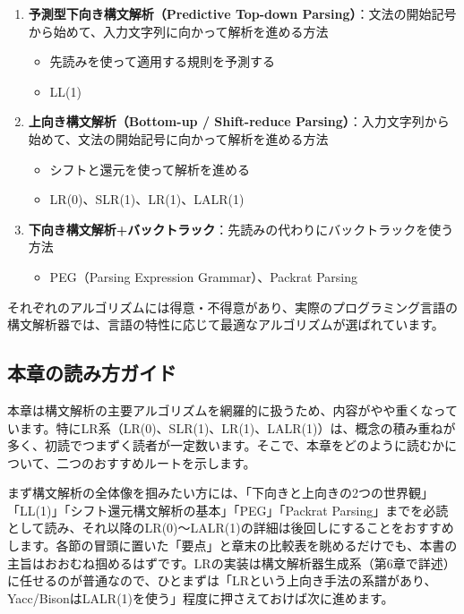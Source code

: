 \begin{enumerate}
\def\labelenumi{\arabic{enumi}.}
\tightlist
\item
  \textbf{予測型下向き構文解析（Predictive Top-down
  Parsing）}：文法の開始記号から始めて、入力文字列に向かって解析を進める方法

  \begin{itemize}
  \tightlist
  \item
    先読みを使って適用する規則を予測する
  \item
    LL(1)
  \end{itemize}
\item
  \textbf{上向き構文解析（Bottom-up / Shift-reduce
  Parsing）}：入力文字列から始めて、文法の開始記号に向かって解析を進める方法

  \begin{itemize}
  \tightlist
  \item
    シフトと還元を使って解析を進める
  \item
    LR(0)、SLR(1)、LR(1)、LALR(1)
  \end{itemize}
\item
  \textbf{下向き構文解析+バックトラック}：先読みの代わりにバックトラックを使う方法

  \begin{itemize}
  \tightlist
  \item
    PEG（Parsing Expression Grammar）、Packrat Parsing
  \end{itemize}
\end{enumerate}

それぞれのアルゴリズムには得意・不得意があり、実際のプログラミング言語の構文解析器では、言語の特性に応じて最適なアルゴリズムが選ばれています。

\hypertarget{chapter5-ux672cux7ae0ux306eux8aadux307fux65b9ux30acux30a4ux30c9}{%
\subsection{本章の読み方ガイド}\label{chapter5-ux672cux7ae0ux306eux8aadux307fux65b9ux30acux30a4ux30c9}}

本章は構文解析の主要アルゴリズムを網羅的に扱うため、内容がやや重くなっています。特にLR系（LR(0)、SLR(1)、LR(1)、LALR(1)）は、概念の積み重ねが多く、初読でつまずく読者が一定数います。そこで、本章をどのように読むかについて、二つのおすすめルートを示します。

まず構文解析の全体像を掴みたい方には、「下向きと上向きの2つの世界観」「LL(1)」「シフト還元構文解析の基本」「PEG」「Packrat
Parsing」までを必読として読み、それ以降のLR(0)〜LALR(1)の詳細は後回しにすることをおすすめします。各節の冒頭に置いた「要点」と章末の比較表を眺めるだけでも、本書の主旨はおおむね掴めるはずです。LRの実装は構文解析器生成系（第6章で詳述）に任せるのが普通なので、ひとまずは「LRという上向き手法の系譜があり、Yacc/BisonはLALR(1)を使う」程度に押さえておけば次に進めます。

